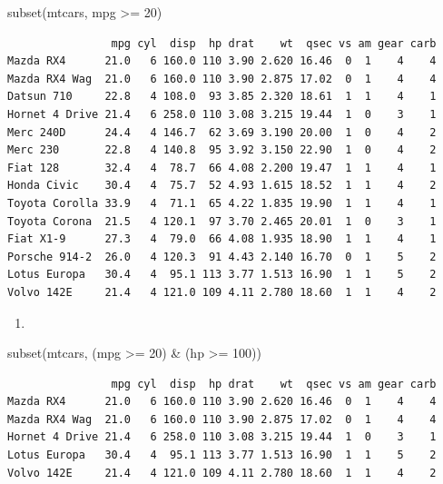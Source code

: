 \documentclass[
  letterpaper,
  DIV=11,
  numbers=noendperiod]{scrreprt}
\newenvironment{Shaded}{\begin{snugshade}}{\end{snugshade}}
\newcommand{\DecValTok}[1]{\textcolor[rgb]{0.68,0.00,0.00}{#1}}
\newcommand{\FunctionTok}[1]{\textcolor[rgb]{0.28,0.35,0.67}{#1}}
\newcommand{\NormalTok}[1]{\textcolor[rgb]{0.00,0.23,0.31}{#1}}
\newcommand{\SpecialCharTok}[1]{\textcolor[rgb]{0.37,0.37,0.37}{#1}}
\providecommand{\tightlist}{%
  \setlength{\itemsep}{0pt}\setlength{\parskip}{0pt}}\usepackage{longtable,booktabs,array}
\begin{document}
\begin{Shaded}
\begin{Highlighting}[]
\FunctionTok{subset}\NormalTok{(mtcars, mpg }\SpecialCharTok{\textgreater{}=} \DecValTok{20}\NormalTok{)}
\end{Highlighting}
\end{Shaded}

\begin{verbatim}
                mpg cyl  disp  hp drat    wt  qsec vs am gear carb
Mazda RX4      21.0   6 160.0 110 3.90 2.620 16.46  0  1    4    4
Mazda RX4 Wag  21.0   6 160.0 110 3.90 2.875 17.02  0  1    4    4
Datsun 710     22.8   4 108.0  93 3.85 2.320 18.61  1  1    4    1
Hornet 4 Drive 21.4   6 258.0 110 3.08 3.215 19.44  1  0    3    1
Merc 240D      24.4   4 146.7  62 3.69 3.190 20.00  1  0    4    2
Merc 230       22.8   4 140.8  95 3.92 3.150 22.90  1  0    4    2
Fiat 128       32.4   4  78.7  66 4.08 2.200 19.47  1  1    4    1
Honda Civic    30.4   4  75.7  52 4.93 1.615 18.52  1  1    4    2
Toyota Corolla 33.9   4  71.1  65 4.22 1.835 19.90  1  1    4    1
Toyota Corona  21.5   4 120.1  97 3.70 2.465 20.01  1  0    3    1
Fiat X1-9      27.3   4  79.0  66 4.08 1.935 18.90  1  1    4    1
Porsche 914-2  26.0   4 120.3  91 4.43 2.140 16.70  0  1    5    2
Lotus Europa   30.4   4  95.1 113 3.77 1.513 16.90  1  1    5    2
Volvo 142E     21.4   4 121.0 109 4.11 2.780 18.60  1  1    4    2
\end{verbatim}

\begin{enumerate}
\def\labelenumi{\alph{enumi})}
\setcounter{enumi}{4}
\tightlist
\item
\end{enumerate}

\begin{Shaded}
\begin{Highlighting}[]
\FunctionTok{subset}\NormalTok{(mtcars, (mpg }\SpecialCharTok{\textgreater{}=} \DecValTok{20}\NormalTok{) }\SpecialCharTok{\&}\NormalTok{ (hp }\SpecialCharTok{\textgreater{}=} \DecValTok{100}\NormalTok{))}
\end{Highlighting}
\end{Shaded}

\begin{verbatim}
                mpg cyl  disp  hp drat    wt  qsec vs am gear carb
Mazda RX4      21.0   6 160.0 110 3.90 2.620 16.46  0  1    4    4
Mazda RX4 Wag  21.0   6 160.0 110 3.90 2.875 17.02  0  1    4    4
Hornet 4 Drive 21.4   6 258.0 110 3.08 3.215 19.44  1  0    3    1
Lotus Europa   30.4   4  95.1 113 3.77 1.513 16.90  1  1    5    2
Volvo 142E     21.4   4 121.0 109 4.11 2.780 18.60  1  1    4    2
\end{verbatim}
\end{document}
